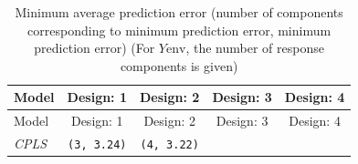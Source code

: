 \documentclass[num-refs]{wiley-article}
\begin{document}
\begin{longtable}[]{@{}lcccc@{}}
\caption{\label{tab:min-error} Minimum average prediction error (number of
components corresponding to minimum prediction error, minimum prediction
error) (For \(Y\text{env}\), the number of response components is
given)}\tabularnewline
\toprule
\begin{minipage}[b]{0.09\columnwidth}\raggedright\strut
Model\strut
\end{minipage} & \begin{minipage}[b]{0.19\columnwidth}\centering\strut
Design: 1\strut
\end{minipage} & \begin{minipage}[b]{0.19\columnwidth}\centering\strut
Design: 2\strut
\end{minipage} & \begin{minipage}[b]{0.19\columnwidth}\centering\strut
Design: 3\strut
\end{minipage} & \begin{minipage}[b]{0.19\columnwidth}\centering\strut
Design: 4\strut
\end{minipage}\tabularnewline
\midrule
\endfirsthead
\toprule
\begin{minipage}[b]{0.09\columnwidth}\raggedright\strut
Model\strut
\end{minipage} & \begin{minipage}[b]{0.19\columnwidth}\centering\strut
Design: 1\strut
\end{minipage} & \begin{minipage}[b]{0.19\columnwidth}\centering\strut
Design: 2\strut
\end{minipage} & \begin{minipage}[b]{0.19\columnwidth}\centering\strut
Design: 3\strut
\end{minipage} & \begin{minipage}[b]{0.19\columnwidth}\centering\strut
Design: 4\strut
\end{minipage}\tabularnewline
\midrule
\endhead
\begin{minipage}[t]{0.09\columnwidth}\raggedright\strut
\emph{CPLS}\strut
\end{minipage} & \begin{minipage}[t]{0.19\columnwidth}\centering\strut
\texttt{(3,\ 3.24)}\strut
\end{minipage} & \begin{minipage}[t]{0.19\columnwidth}\centering\strut
\texttt{(4,\ 3.22)}\strut
\end{minipage} & \begin{minipage}[t]{0.19\columnwidth}\centering\strut

\end{minipage}
\end{longtable}
\end{document}
